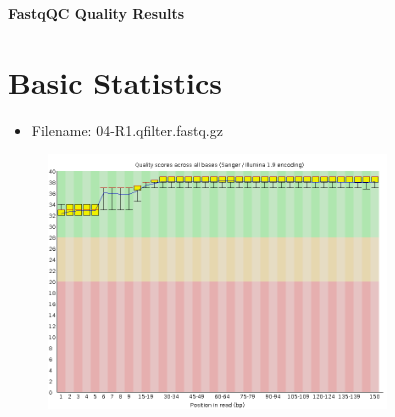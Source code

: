 \documentclass{article}
\begin{document}
\begin{center}
\Large{\textbf{FastqQC Quality Results}}
\end{center}
\section{Basic Statistics}
\begin{itemize}
\item
Filename: 04{-}R1.qfilter.fastq.gz
\end{itemize}




\begin{figure}[htbp]
\centering
\includegraphics[width=0.8\textwidth]{04-R1.qfilter_fastqc/Images/per_base_quality.png}
\end{figure}
\end{document}
